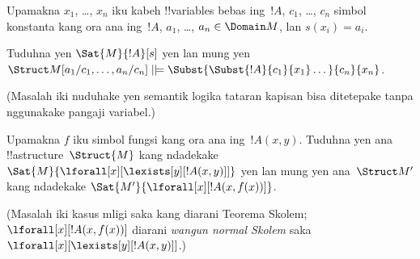 \documentclass[../../../include/open-logic-section]{subfiles}
\begin{document}
\begin{prob}
\begin{enumerate}

\end{enumerate}
Upamakna $x_1$, \dots, $x_n$ iku kabeh !!{variable}s bebas
ing~$!A$, $c_1$, \dots, $c_n$ simbol konstanta kang ora ana
ing~$!A$, $a_1$, \dots, $a_n \in \Domain M$, lan
$s(x_i) = a_i$.

Tuduhna yen $\Sat{M}{!A}[s]$ yen lan mung yen
$\Struct M[a_1/c_1,\dots,a_n/c_n]
\VDash \Subst{\Subst{!A}{c_1}{x_1}\dots}{c_n}{x_n}$.

(Masalah iki nuduhake yen semantik logika tataran kapisan bisa
ditetepake tanpa nggunakake pangaji variabel.)
\end{prob}

\begin{prob}
Upamakna $f$ iku simbol fungsi kang ora ana
ing~$!A(x,y)$. Tuduhna yen ana !!a{structure}~$\Struct{M}$
kang ndadekake
$\Sat{M}{\lforall[x][\lexists[y][!A(x,y)]]}$
yen lan mung yen ana~$\Struct M'$ kang ndadekake
$\Sat{M'}{\lforall[x][!A(x,f(x))]}$.

(Masalah iki kasus mligi saka kang diarani Teorema Skolem;
$\lforall[x][!A(x,f(x))]$ diarani \emph{wangun normal Skolem}
saka $\lforall[x][\lexists[y][!A(x,y)]]$.)
\end{prob}
\end{document}
